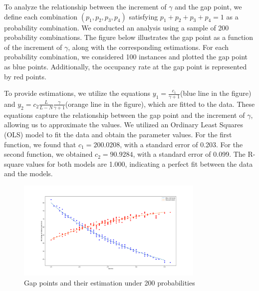 To analyze the relationship between the increment of $\gamma$ and the gap point, we define each combination $(p_1, p_2, p_3, p_4)$ satisfying $p_1 + p_2 + p_3 + p_4 = 1$ as a probability combination. We conducted an analysis using a sample of 200 probability combinations. The figure below illustrates the gap point as a function of the increment of $\gamma$, along with the corresponding estimations. For each probability combination, we considered 100 instances and plotted the gap point as blue points. Additionally, the occupancy rate at the gap point is represented by red points.

To provide estimations, we utilize the equations $y_1 = \frac{c_1}{\gamma +1}$(blue line in the figure) and $y_2 = c_2 \frac{L}{L-N} \frac{\gamma}{\gamma+1}$(orange line in the figure), which are fitted to the data. These equations capture the relationship between the gap point and the increment of $\gamma$, allowing us to approximate the values. We utilized an Ordinary Least Squares (OLS) model to fit the data and obtain the parameter values. For the first function, we found that $c_1 = 200.0208$, with a standard error of 0.203. For the second function, we obtained $c_2 = 90.9284$, with a standard error of 0.099. The R-square values for both models are 1.000, indicating a perfect fit between the data and the models.


\begin{figure}[ht]
  \centering
    \includegraphics[width=0.8\textwidth]{./Figures/gamma_estimation.pdf}
  \caption{Gap points and their estimation under 200 probabilities}
\end{figure}

